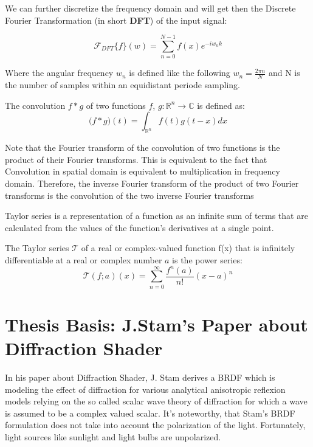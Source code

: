We can further discretize the frequency domain and will get then the Discrete Fourier Transformation (in short \textbf{DFT}) of the input signal:

\begin{equation}
  \mathcal{F}_{DFT}\{f\}(w) = \sum_{n=0}^{N-1} f(x) e^{-iw_{n}k}
\end{equation}

Where the angular frequency $w_n$ is defined like the following $w_n = \frac{2\pi n}{N}$ and N is the number of samples within an equidistant periode sampling.

The convolution $f*g$ of two functions $f$, $g$$\colon \mathds{R}^n \to \mathds{C} $ is defined as:  
\begin{equation}
  \mathcal (f*g)(t) = \int_{\mathds{R}^n} f(t)g(t-x) dx
\end{equation}

Note that the Fourier transform of the convolution of two functions is the product of their Fourier transforms. This is equivalent to the fact that Convolution in spatial domain is equivalent to multiplication in frequency domain. Therefore, the inverse Fourier transform of the product of two Fourier transforms is the convolution of the two inverse Fourier transforms

Taylor series is a representation of a function as an infinite sum of terms that are calculated from the values of the function's derivatives at a single point.

The Taylor series $\mathcal T$ of a real or complex-valued function ƒ(x) that is infinitely differentiable at a real or complex number $a$ is the power series:
\begin{equation}
  \mathcal T(f;a)(x) = \sum_{n=0}^{\infty} \frac{f^{n}(a)}{n!}(x-a)^n
\end{equation}


\section{Thesis Basis: J.Stam's Paper about Diffraction Shader}
In his paper about Diffraction Shader, J. Stam derives a BRDF which is modeling the effect of diffraction for various analytical anisotropic reflexion models relying on the so called scalar wave theory of diffraction for which a wave is assumed to be a complex valued scalar. 
It's noteworthy, that Stam's BRDF formulation does not take into account the polarization of the light. Fortunately, light sources like sunlight and light bulbs are unpolarized. 

